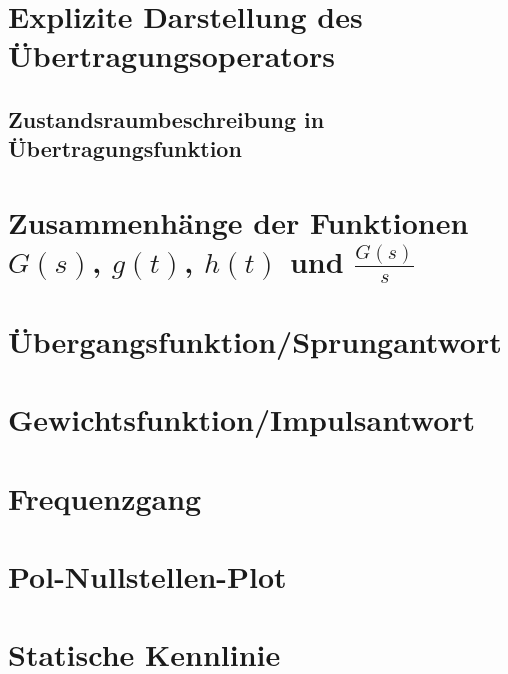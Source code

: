 \documentclass[
  ngerman
  ,12pt
  ,pdftex
]{article}
\begin{document}
\section{Explizite Darstellung des Übertragungsoperators}


\subsection*{Zustandsraumbeschreibung in Übertragungsfunktion}


\section{Zusammenhänge der Funktionen $G(s)$, $g(t)$, $h(t)$ und $\frac{G(s)}{s}$}


\section{Übergangsfunktion/Sprungantwort}


\section{Gewichtsfunktion/Impulsantwort}


\section{Frequenzgang}


\section{Pol-Nullstellen-Plot}


\section{Statische Kennlinie}

\end{document}
